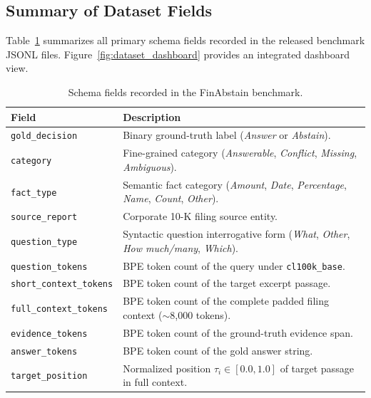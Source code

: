 \documentclass[11pt,letterpaper]{article}
\begin{document}
\subsection{Summary of Dataset Fields}
\label{app:dataset_fields}

Table~\ref{tab:dataset_fields} summarizes all primary schema fields recorded in the released benchmark JSONL files. Figure~\ref{fig:dataset_dashboard} provides an integrated dashboard view.

\begin{table}[h]
\centering
\small
\caption{Schema fields recorded in the FinAbstain benchmark.}
\label{tab:dataset_fields}
\begin{tabular}{p{}p{}}
\toprule
\textbf{Field} & \textbf{Description} \\
\midrule
\texttt{gold\_decision}        & Binary ground-truth label (\textit{Answer} or \textit{Abstain}). \\
\texttt{category}             & Fine-grained category (\textit{Answerable}, \textit{Conflict}, \textit{Missing}, \textit{Ambiguous}). \\
\texttt{fact\_type}            & Semantic fact category (\textit{Amount}, \textit{Date}, \textit{Percentage}, \textit{Name}, \textit{Count}, \textit{Other}). \\
\texttt{source\_report}        & Corporate 10-K filing source entity. \\
\texttt{question\_type}        & Syntactic question interrogative form (\textit{What}, \textit{Other}, \textit{How much/many}, \textit{Which}). \\
\texttt{question\_tokens}      & BPE token count of the query under \texttt{cl100k\_base}. \\
\texttt{short\_context\_tokens} & BPE token count of the target excerpt passage. \\
\texttt{full\_context\_tokens}  & BPE token count of the complete padded filing context ($\sim$8,000 tokens). \\
\texttt{evidence\_tokens}      & BPE token count of the ground-truth evidence span. \\
\texttt{answer\_tokens}        & BPE token count of the gold answer string. \\
\texttt{target\_position}      & Normalized position $\tau_i \in [0.0, 1.0]$ of target passage in full context. \\
\bottomrule
\end{tabular}
\end{table}
\end{document}
